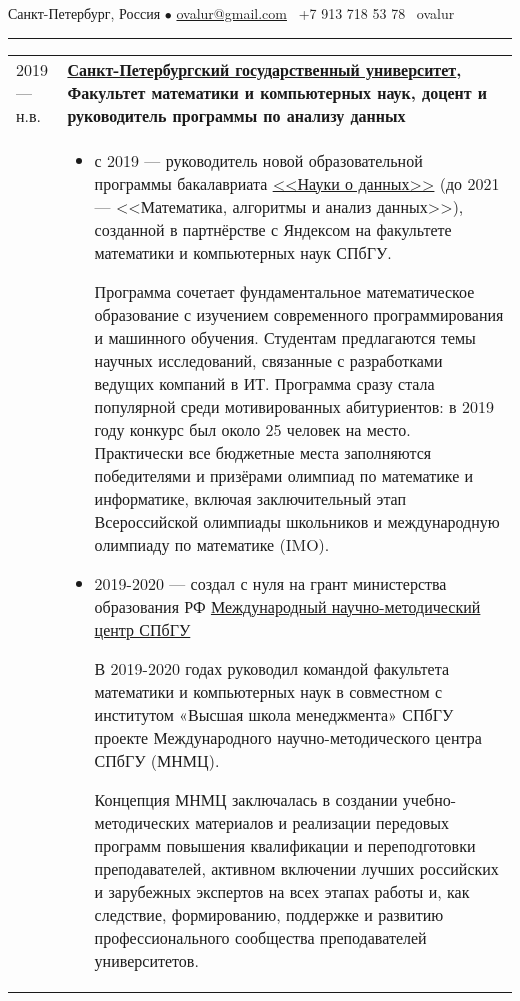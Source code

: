 \documentclass[11pt]{article}
\begin{document}

\vspace{0.5em}

\noindent Санкт-Петербург, Россия $\bullet$ \href{mailto:ovalur@gmail.com}{ovalur@gmail.com} \faMobile~+7 913 718 53 78 \faSendO~ovalur

\vspace{0.5em}
\hrule
\vspace{0.5em}

\begin{longtable} {l | p{}}
2019 — н.в. & {\textbf{\href{https://spbu.ru}{Санкт-Петербургский государственный университет}, Факультет математики и компьютерных наук, доцент и руководитель программы по анализу данных}} \\
&
\begin{itemize}
	\item с 2019 — руководитель новой образовательной программы бакалавриата \href{https://maad.compscicenter.ru}{<<Науки о данных>>} (до 2021 — <<Математика, алгоритмы и анализ данных>>), созданной в партнёрстве с Яндексом на факультете математики и компьютерных наук СПбГУ.

	Программа сочетает фундаментальное математическое образование с изучением современного программирования и машинного обучения. Студентам предлагаются темы научных исследований, связанные с разработками ведущих компаний в ИТ. Программа сразу стала популярной среди мотивированных абитуриентов: в 2019 году конкурс был около 25 человек на место. Практически все бюджетные места заполняются победителями и призёрами олимпиад по математике и информатике, включая заключительный этап Всероссийской олимпиады школьников и международную олимпиаду по математике (IMO).

	\item 2019-2020 — создал с нуля на грант министерства образования РФ \href{https://gsom.spbu.ru/all_news/event2021-02-04/}{Международный научно-методический центр СПбГУ}

	В 2019-2020 годах руководил командой факультета математики и компьютерных наук в совместном с институтом «Высшая школа менеджмента» СПбГУ проекте Международного научно-методического центра СПбГУ (МНМЦ).

	Концепция МНМЦ заключалась в создании учебно-методических материалов и реализации передовых программ повышения квалификации и переподготовки преподавателей, активном включении лучших российских и зарубежных экспертов на всех этапах работы и, как следствие, формированию, поддержке и развитию профессионального сообщества преподавателей университетов.


\end{itemize}
\end{longtable}
\end{document}
